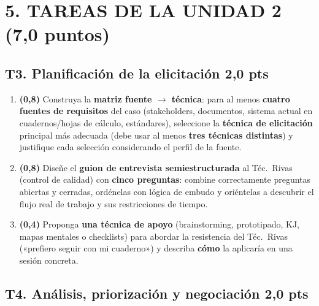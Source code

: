 \documentclass[11pt]{article}
\newcommand{\pts}[1]{\hfill{\normalsize\textbf{\textcolor{utegreendk}{#1 pts}}}}
\begin{document}
\section*{\textcolor{utegreendk}{5. TAREAS DE LA UNIDAD 2 \,(7{,}0 puntos)}}

\subsection*{T3. Planificación de la elicitación \pts{2{,}0}}

\begin{enumerate}[label=\textbf{T3.\arabic*},leftmargin=26pt,itemsep=3pt]
  \item \textbf{(0{,}8)} Construya la \textbf{matriz fuente $\rightarrow$ técnica}: para al menos \textbf{cuatro fuentes de requisitos} del caso (stakeholders, documentos, sistema actual en cuadernos/hojas de cálculo, estándares), seleccione la \textbf{técnica de elicitación} principal más adecuada (debe usar al menos \textbf{tres técnicas distintas}) y justifique cada selección considerando el perfil de la fuente.
  \item \textbf{(0{,}8)} Diseñe el \textbf{guion de entrevista semiestructurada} al Téc.\ Rivas (control de calidad) con \textbf{cinco preguntas}: combine correctamente preguntas abiertas y cerradas, ordénelas con lógica de embudo y oriéntelas a descubrir el flujo real de trabajo y sus restricciones de tiempo.
  \item \textbf{(0{,}4)} Proponga \textbf{una técnica de apoyo} (brainstorming, prototipado, KJ, mapas mentales o checklists) para abordar la resistencia del Téc.\ Rivas («prefiero seguir con mi cuaderno») y describa \textbf{cómo} la aplicaría en una sesión concreta.
\end{enumerate}

\subsection*{T4. Análisis, priorización y negociación \pts{2{,}0}}
\end{document}
